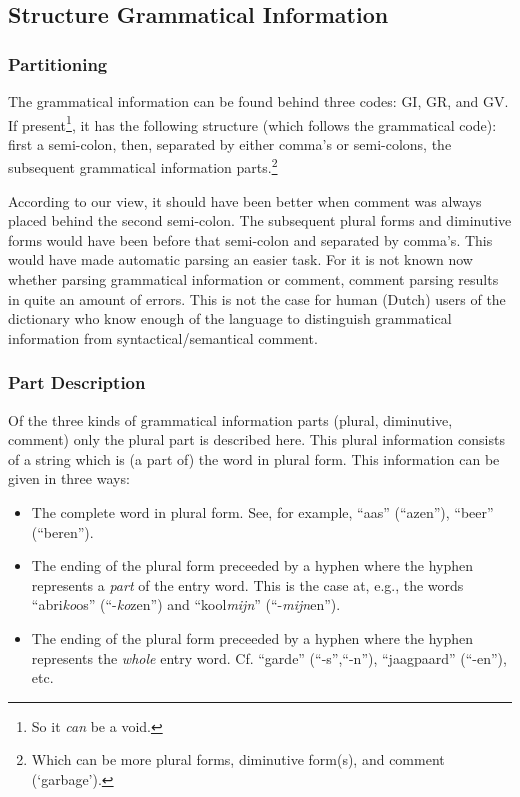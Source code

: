 \subsection{Structure Grammatical Information}

\subsubsection{Partitioning}

The grammatical information can be found behind three codes: GI, GR, and GV.
If present\footnote{So it {\em can} be a void.}, it has the following structure
(which follows the grammatical code): first a semi-colon, then, 
separated by either comma's or semi-colons, the subsequent grammatical 
information parts.\footnote{Which can be more plural forms, diminutive form(s),
and comment (`garbage').}

According to our view, it should have been better when comment was always 
placed behind the second semi-colon. The subsequent plural forms and diminutive 
forms would have been before that semi-colon and separated by comma's. This 
would have made automatic parsing an easier task. For it is not known now 
whether parsing grammatical information or comment, comment parsing results in 
quite an amount of errors. This is not the case for human (Dutch) users of 
the dictionary who know enough of the language to distinguish grammatical 
information from syntactical/semantical comment.

\subsubsection{Part Description}

Of the three kinds of grammatical information parts (plural, diminutive, 
comment) only the plural part is described here. This plural information 
consists of a string which is (a part of) the word in plural form. This 
information can be given in three ways:

\begin{itemize}
  \item The complete word in plural form. See, for example, ``aas'' (``azen''),
        ``beer'' (``beren'').
  \item The ending of the plural form preceeded by a hyphen where the hyphen 
        represents a {\em part} of the entry word. This is the case at, e.g.,
        the words ``abri{\em ko}os'' (``-{\em ko}zen'') and ``kool{\em mijn}''
        (``-{\em mijn}en'').
  \item The ending of the plural form preceeded by a hyphen where the hyphen 
        represents the {\em whole} entry word. Cf. ``garde'' (``-s'',``-n''),
        ``jaagpaard'' (``-en''), etc.
\end{itemize}

